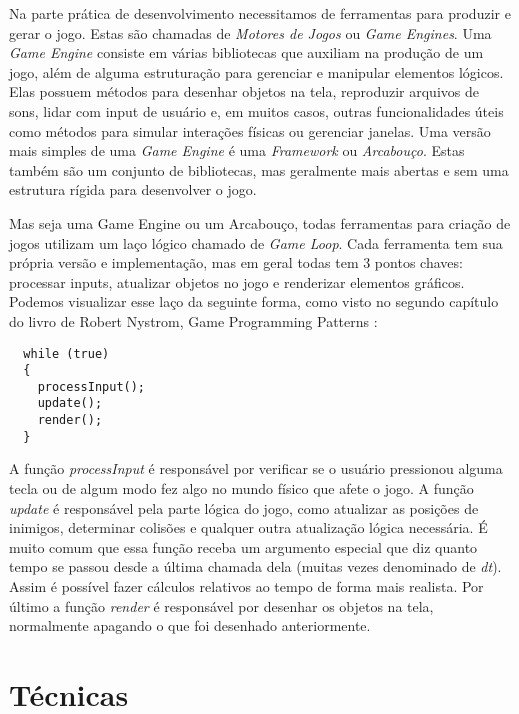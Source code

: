Na parte prática de desenvolvimento necessitamos de ferramentas para produzir e gerar o jogo. Estas são chamadas de \textit{Motores de Jogos} ou \textit{Game Engines}. Uma \textit{Game Engine} consiste em várias bibliotecas que auxiliam na produção de um jogo, além de alguma estruturação para gerenciar e manipular elementos lógicos. Elas possuem métodos para desenhar objetos na tela, reproduzir arquivos de sons, lidar com input de usuário e, em muitos casos, outras funcionalidades úteis como métodos para simular interações físicas ou gerenciar janelas. Uma versão mais simples de uma \textit{Game Engine} é uma \textit{Framework} ou \textit{Arcabouço}. Estas também são um conjunto de bibliotecas, mas geralmente mais abertas e sem uma estrutura rígida para desenvolver o jogo.

Mas seja uma Game Engine ou um Arcabouço, todas ferramentas para criação de jogos utilizam um laço lógico chamado de \textit{Game Loop}. Cada ferramenta tem sua própria versão e implementação, mas em geral todas tem 3 pontos chaves: processar inputs, atualizar objetos no jogo e renderizar elementos gráficos. Podemos visualizar esse laço da seguinte forma, como visto no segundo capítulo do livro de Robert Nystrom, Game Programming Patterns \cite{robertgameloop}:

\begin{lstlisting}
  while (true)
  {
    processInput();
    update();
    render();
  }
\end{lstlisting}

A função \textit{processInput} é responsável por verificar se o usuário pressionou alguma tecla ou de algum modo fez algo no mundo físico que afete o jogo. A função \textit{update} é responsável pela parte lógica do jogo, como atualizar as posições de inimigos, determinar colisões e qualquer outra atualização lógica necessária. É muito comum que essa função receba um argumento especial que diz quanto tempo se passou desde a última chamada dela (muitas vezes denominado de \textit{dt}). Assim é possível fazer cálculos relativos ao tempo de forma mais realista. Por último a função \textit{render} é responsável por desenhar os objetos na tela, normalmente apagando o que foi desenhado anteriormente.


\section{Técnicas}
\label{sec:tecnicas}

